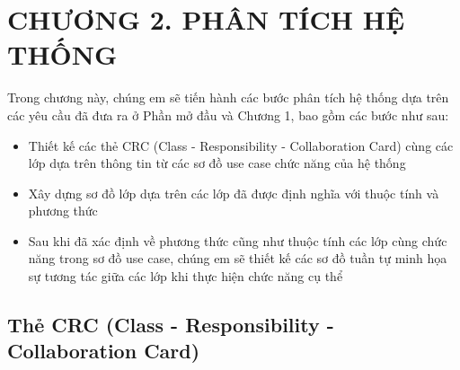 
\section*{CHƯƠNG 2. PHÂN TÍCH HỆ THỐNG}
\setcounter{section}{2}
\setcounter{subsection}{0} %
\setcounter{table}{0} %
\setcounter{figure}{0} %
Trong chương này, chúng em sẽ tiến hành các bước phân tích hệ thống dựa trên các yêu cầu đã đưa ra ở Phần mở đầu và Chương 1, bao gồm các bước như sau:
\begin{adjustwidth}{1.5em}{}
  \begin{itemize}
    \item Thiết kế các thẻ CRC (Class - Responsibility - Collaboration Card) cùng các lớp dựa trên thông tin từ các sơ đồ use case chức năng của hệ thống
    \item Xây dựng sơ đồ lớp dựa trên các lớp đã được định nghĩa với thuộc tính và phương thức
    \item Sau khi đã xác định về phương thức cũng như thuộc tính các lớp cùng chức năng trong sơ đồ use case, chúng em sẽ thiết kế các sơ đồ tuần tự minh họa sự tương tác giữa các lớp 
          khi thực hiện chức năng cụ thể
  \end{itemize}
  \end{adjustwidth}
\subsection{Thẻ CRC (Class - Responsibility - Collaboration Card)}

